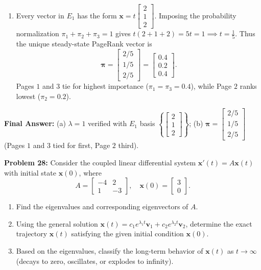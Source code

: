 \documentclass[11pt, letterpaper]{article}
\theoremstyle{definition}
\theoremstyle{remark}
\begin{document}
\begin{enumerate}[label=(\alph*)]
    \item Every vector in $E_1$ has the form $\mathbf{x} = t\begin{bmatrix} 2 \\ 1 \\ 2 \end{bmatrix}$. Imposing the probability normalization $\pi_1 + \pi_2 + \pi_3 = 1$ gives $t(2 + 1 + 2) = 5t = 1 \implies t = \frac{1}{5}$. Thus the unique steady-state PageRank vector is
    \[
    \boldsymbol{\pi} = \begin{bmatrix} 2/5 \\ 1/5 \\ 2/5 \end{bmatrix} = \begin{bmatrix} 0.4 \\ 0.2 \\ 0.4 \end{bmatrix}.
    \]
    Pages $1$ and $3$ tie for highest importance ($\pi_1 = \pi_3 = 0.4$), while Page $2$ ranks lowest ($\pi_2 = 0.2$).
\end{enumerate}
\textbf{Final Answer:} (a) $\lambda = 1$ verified with $E_1$ basis $\left\{ \begin{bmatrix} 2 \\ 1 \\ 2 \end{bmatrix} \right\}$; (b) $\boldsymbol{\pi} = \begin{bmatrix} 2/5 \\ 1/5 \\ 2/5 \end{bmatrix}$ (Pages $1$ and $3$ tied for first, Page $2$ third).

\vspace{0.4em}
\textbf{Problem 28:}
Consider the coupled linear differential system $\mathbf{x}'(t) = A\mathbf{x}(t)$ with initial state $\mathbf{x}(0)$, where
\[
A = \begin{bmatrix} -4 & 2 \\ 1 & -3 \end{bmatrix}, \quad \mathbf{x}(0) = \begin{bmatrix} 3 \\ 0 \end{bmatrix}.
\]
\begin{enumerate}[label=(\alph*)]
    \item Find the eigenvalues and corresponding eigenvectors of $A$.
    \item Using the general solution $\mathbf{x}(t) = c_1 e^{\lambda_1 t}\mathbf{v}_1 + c_2 e^{\lambda_2 t}\mathbf{v}_2$, determine the exact trajectory $\mathbf{x}(t)$ satisfying the given initial condition $\mathbf{x}(0)$.
    \item Based on the eigenvalues, classify the long-term behavior of $\mathbf{x}(t)$ as $t \to \infty$ (decays to zero, oscillates, or explodes to infinity).
\end{enumerate}
\end{document}
